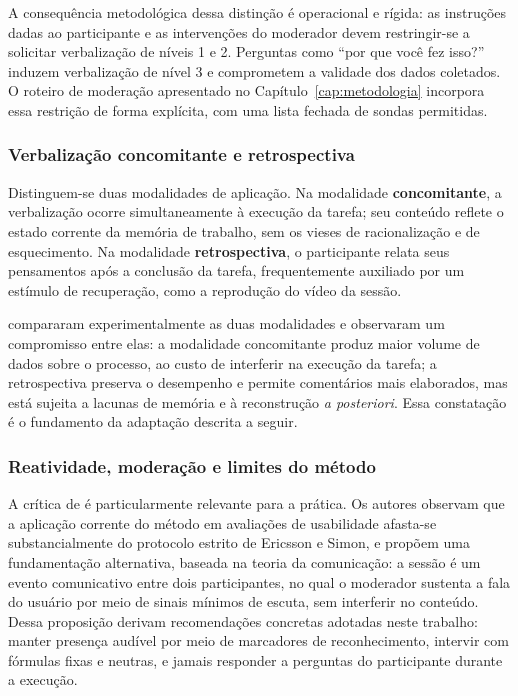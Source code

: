 A consequência metodológica dessa distinção é operacional e rígida: as instruções
dadas ao participante e as intervenções do moderador devem restringir-se a
solicitar verbalização de níveis 1 e 2. Perguntas como ``por que você fez isso?''
induzem verbalização de nível 3 e comprometem a validade dos dados coletados. O
roteiro de moderação apresentado no Capítulo~\ref{cap:metodologia} incorpora essa
restrição de forma explícita, com uma lista fechada de sondas permitidas.

\subsubsection{Verbalização concomitante e retrospectiva}

Distinguem-se duas modalidades de aplicação. Na modalidade
\textbf{concomitante}, a verbalização ocorre simultaneamente à execução da
tarefa; seu conteúdo reflete o estado corrente da memória de trabalho, sem os
vieses de racionalização e de esquecimento. Na modalidade
\textbf{retrospectiva}, o participante relata seus pensamentos após a conclusão
da tarefa, frequentemente auxiliado por um estímulo de recuperação, como a
reprodução do vídeo da sessão.

 compararam experimentalmente as duas modalidades e
observaram um compromisso entre elas: a modalidade concomitante produz maior
volume de dados sobre o processo, ao custo de interferir na execução da tarefa;
a retrospectiva preserva o desempenho e permite comentários mais elaborados, mas
está sujeita a lacunas de memória e à reconstrução \textit{a posteriori}. Essa
constatação é o fundamento da adaptação descrita a seguir.

\subsubsection{Reatividade, moderação e limites do método}

A crítica de  é particularmente relevante para a
prática. Os autores observam que a aplicação corrente do método em avaliações de
usabilidade afasta-se substancialmente do protocolo estrito de Ericsson e Simon,
e propõem uma fundamentação alternativa, baseada na teoria da comunicação: a
sessão é um evento comunicativo entre dois participantes, no qual o moderador
sustenta a fala do usuário por meio de sinais mínimos de escuta, sem interferir no
conteúdo. Dessa proposição derivam recomendações concretas adotadas neste
trabalho: manter presença audível por meio de marcadores de reconhecimento,
intervir com fórmulas fixas e neutras, e jamais responder a perguntas do
participante durante a execução.

